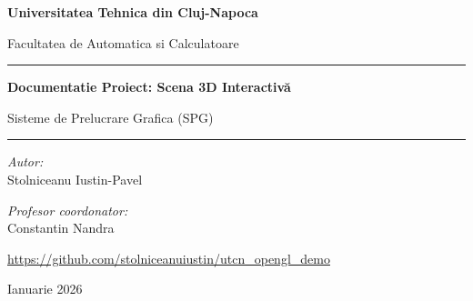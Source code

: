 \documentclass[11pt,a4paper]{article}
\begin{document}

\begin{titlepage}
    \centering
    \vspace*{2cm}
    {\Huge \textbf{Universitatea Tehnica din Cluj-Napoca}} \par
    \vspace{1cm}
    {\Large Facultatea de Automatica si Calculatoare} \par
    \vspace{3cm}
    \rule{\linewidth}{0.5mm} \par
    \vspace{0.4cm}
    {\huge \textbf{Documentatie Proiect: Scena {3D} Interactivă}} \par
    \vspace{0.4cm}
    \large Sisteme de Prelucrare Grafica (SPG) \par
    \vspace{0.4cm}
    \rule{\linewidth}{0.5mm} \par
    \vspace{4cm}
    \begin{minipage}{0.4\textwidth}
        \begin{flushleft} \large
            \emph{Autor:}\\
            Stolniceanu Iustin-Pavel
        \end{flushleft}
    \end{minipage}
    \begin{minipage}{0.4\textwidth}
        \begin{flushright} \large
            \emph{Profesor coordonator:} \\
            Constantin Nandra
        \end{flushright}
    \end{minipage}
    
    \vfill
    
    {\large \url{https://github.com/stolniceanuiustin/utcn_opengl_demo}} \par
    \vspace{0.5cm}
    
    {\large Ianuarie 2026}
\end{titlepage}
\newpage
\tableofcontents
\newpage
\end{document}
